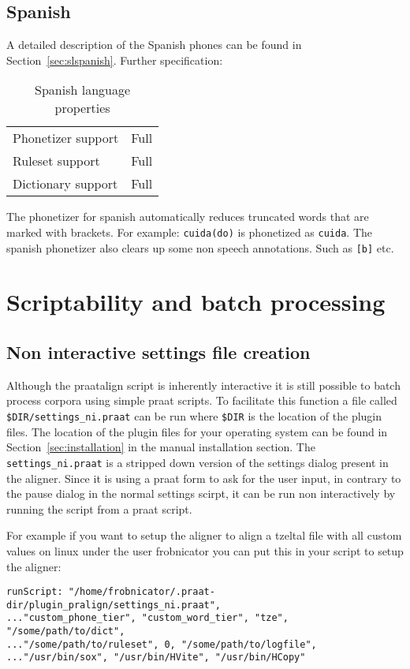 \subsection{Spanish}
A detailed description of the Spanish phones can be found in
Section~\ref{sec:slspanish}. Further specification:
\begin{table}[H]
	\caption{Spanish language properties}
	\begin{tabular}{ll}
		Phonetizer support & Full\\
		Ruleset support & Full\\
		Dictionary support & Full
	\end{tabular}
\end{table}

The phonetizer for spanish automatically reduces truncated words that are
marked with brackets. For example: \texttt{cuida(do)} is phonetized as
\texttt{cuida}. The spanish phonetizer also clears up some non speech
annotations. Such as \texttt{[b]} etc.

\section{Scriptability and batch processing}
\subsection{Non interactive settings file creation}
Although the praatalign script is inherently interactive it is still possible
to batch process corpora using simple praat scripts. To facilitate this
function a file called \texttt{\$DIR/settings\_ni.praat} can be run where
\texttt{\$DIR} is the location of the plugin files. The location of the plugin
files for your operating system can be found in Section~\ref{sec:installation}
in the manual installation section. The \texttt{settings\_ni.praat} is a
stripped down version of the settings dialog present in the aligner. Since it
is using a praat form to ask for the user input, in contrary to the pause
dialog in the normal settings scirpt, it can be run non interactively by
running the script from a praat script.

For example if you want to setup the aligner to align a tzeltal file with all
custom values on linux under the user frobnicator you can put this in your
script to setup the aligner:

\begin{lstlisting}
runScript: "/home/frobnicator/.praat-dir/plugin_pralign/settings_ni.praat",
..."custom_phone_tier", "custom_word_tier", "tze", "/some/path/to/dict",
..."/some/path/to/ruleset", 0, "/some/path/to/logfile",
..."/usr/bin/sox", "/usr/bin/HVite", "/usr/bin/HCopy"
\end{lstlisting}

